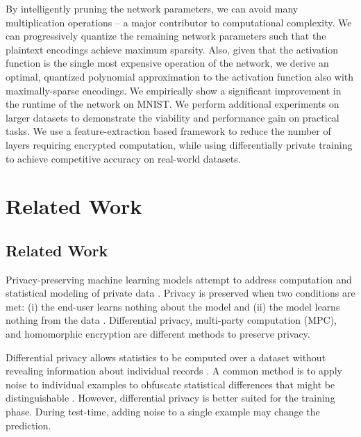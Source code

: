 \documentclass[conference]{IEEEtran}
\begin{document}
By intelligently pruning the network parameters, we can avoid many multiplication operations -- a major contributor to computational complexity. 
We can progressively quantize the remaining network parameters such that the plaintext encodings achieve maximum sparsity.
Also, given that the activation function is the single most expensive operation of the network, we derive an optimal, quantized polynomial approximation to the activation function also with maximally-sparse encodings.
We empirically show a significant improvement in the runtime of the network on MNIST.
We perform additional experiments on larger datasets to demonstrate the viability and performance gain on practical tasks.
We use a feature-extraction based framework to reduce the number of layers requiring encrypted computation, while using differentially private training to achieve competitive accuracy on real-world datasets.





\section{Related Work}\label{sec:related_work}
\subsection{Related Work}


Privacy-preserving machine learning models attempt to address computation and statistical modeling of private data \cite{agrawal2000privacy}.
Privacy is preserved when two conditions are met: (i) the end-user learns nothing about the model and (ii) the model learns nothing from the data \cite{brickell2009privacy}.
Differential privacy, multi-party computation (MPC), and homomorphic encryption are different methods to preserve privacy.


Differential privacy allows statistics to be computed over a dataset without revealing information about individual records \cite{dwork2008differential, chaudhuri2011differentially}.
A common method is to apply noise to individual examples to obfuscate statistical differences that might be distinguishable \cite{papernot2016semi}.
However, differential privacy is better suited for the training phase. During test-time, adding noise to a single example may change the prediction.
\end{document}
